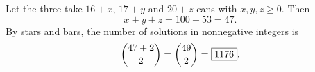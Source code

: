 Let the three take $16+x$, $17+y$ and $20+z$ cans with $x,y,z\ge0$. Then
\[
x+y+z=100-53=47 .
\]
By stars and bars, the number of solutions in nonnegative integers is
\[
\dbinom{47+2}{2}=\dbinom{49}{2}=\boxed{1176}.
\]
